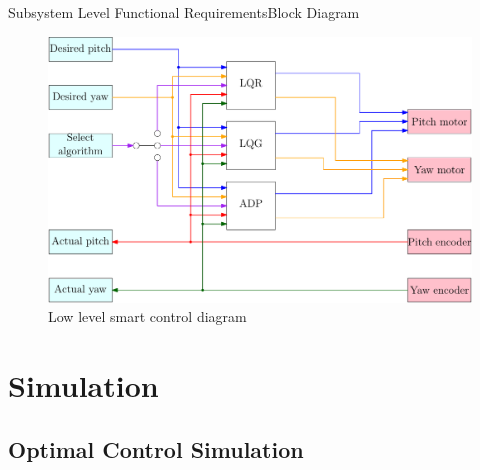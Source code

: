 \documentclass{beamer}
\begin{document}
\begin{frame}{Subsystem Level Functional Requirements}{Block Diagram} 

\begin{figure}
  \centering 
  \includegraphics[scale=0.31]{figs/ipe/lowLevel}
  \caption{Low level smart control diagram}
  \label{fig:ProposalImage}
\end{figure}

\end{frame}


\section{Simulation}

\subsection{Optimal Control Simulation}
\end{document}

